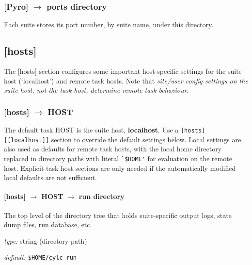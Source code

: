 \subsubsection[ports directory]{[Pyro] $\rightarrow$ ports directory}

Each suite stores its port number, by suite name, under this directory.


\subsection{[hosts]}

The [hosts] section configures some important host-specific settings for
the suite host (`localhost') and remote task hosts. Note that {\em
site/user config settings on the suite host, not the task host,
determine remote task behaviour}. 

\subsubsection[{[[}HOST{]]}]{[hosts] $\rightarrow$ HOST}

The default task HOST is the suite host, {\bf localhost}. Use a   
\lstinline=[hosts][[localhost]]= section to override the default
settings below. Local settings are also used as defaults for remote task
hosts, with the local home directory replaced in directory paths with
literal \lstinline=`$HOME'= for evaluation on the remote host.  Explicit 
task host sections are only needed if the automatically modified local
defaults are not sufficient.

\paragraph[run directory]{[hosts] $\rightarrow$ HOST $\rightarrow$ run directory }

The top level of the directory tree that holds suite-specific output logs,
state dump files, run database, etc.

\begin{myitemize}
\item {\em type:} string (directory path)
\item {\em default:} \lstinline=$HOME/cylc-run=
\end{myitemize}


